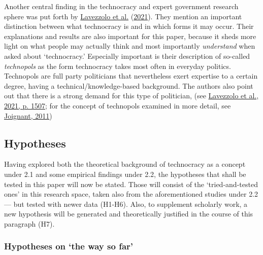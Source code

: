 \documentclass[
  12pt,
  english,
]{article}
\begin{document}
Another central finding in the technocracy and expert government
research sphere was put forth by
\protect\hyperlink{ref-lavezzolo2021will}{Lavezzolo et al.}
(\protect\hyperlink{ref-lavezzolo2021will}{2021}). They mention an
important distinction between what technocracy is and in which forms it
may occur. Their explanations and results are also important for this
paper, because it sheds more light on what people may actually think and
most importantly \emph{understand} when asked about `technocracy.'
Especially important is their description of so-called \emph{technopols}
as the form technocracy takes most often in everyday politics.
Technopols are full party politicians that nevertheless exert expertise
to a certain degree, having a technical/knowledge-based background. The
authors also point out that there is a strong demand for this type of
politician, (see \protect\hyperlink{ref-lavezzolo2021will}{Lavezzolo et
al., 2021, p. 1507}; for the concept of technopols examined in more
detail, see \protect\hyperlink{ref-joignant2011technopols}{Joignant,
2011})

\hypertarget{hypotheses}{%
\subsection{Hypotheses}\label{hypotheses}}

Having explored both the theoretical background of technocracy as a
concept under 2.1 and some empirical findings under 2.2, the hypotheses
that shall be tested in this paper will now be stated. Those will
consist of the `tried-and-tested ones' in this research space, taken
also from the aforementioned studies under 2.2 --- but tested with newer
data (H1-H6). Also, to supplement scholarly work, a new hypothesis will
be generated and theoretically justified in the course of this paragraph
(H7).

\hypertarget{hypotheses-on-the-way-so-far}{%
\subsubsection{Hypotheses on `the way so
far'}\label{hypotheses-on-the-way-so-far}}
\end{document}
